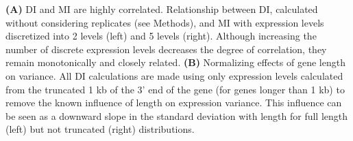 
\textbf{(A)} DI and MI are highly correlated. Relationship between DI, calculated without considering replicates (see Methods), and MI with expression levels discretized into 2 levels (left) and 5 levels (right). Although increasing the number of discrete expression levels decreases the degree of correlation, they remain monotonically and closely related.
\textbf {(B)} Normalizing effects of gene length on variance. All DI calculations are made using only expression levels calculated from the truncated 1 kb of the 3' end of the gene (for genes longer than 1 kb) to remove the known influence of length on expression variance. This influence can be seen as a downward slope in the standard deviation with length for full length (left) but not truncated (right) distributions.